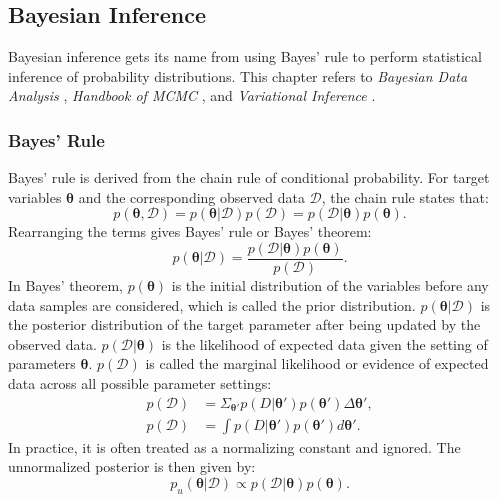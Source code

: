 \subsection{Bayesian Inference}
Bayesian inference gets its name from using Bayes' rule to perform statistical inference of probability distributions.
This chapter refers to \textit{Bayesian Data Analysis} \citep{gelman2013bayesian}, \textit{Handbook of MCMC} \citep{Allen_2007}, and \textit{Variational Inference} \citep{Blei_2017}.

\subsubsection{Bayes' Rule}
Bayes' rule is derived from the chain rule of conditional probability. For target variables $\boldsymbol{\theta}$ and the corresponding observed data $\mathcal{D}$, the chain rule states that:
\begin{equation}
    p(\boldsymbol{\theta}, \mathcal{D}) = p(\boldsymbol{\theta}|\mathcal{D})p(\mathcal{D}) = p(\mathcal{D}|\boldsymbol{\theta})p(\boldsymbol{\theta}).
\end{equation}
Rearranging the terms gives Bayes' rule or Bayes' theorem:
\begin{equation}
\label{eq:bayes}
    p(\boldsymbol{\theta}|\mathcal{D})= \frac{p(\mathcal{D}|\boldsymbol{\theta})p(\boldsymbol{\theta})}{p(\mathcal{D})}.
\end{equation}
In Bayes' theorem, $p(\boldsymbol{\theta})$ is the initial distribution of the variables before any data samples are considered, which is called the prior distribution. $p(\boldsymbol{\theta}|\mathcal{D})$ is the posterior distribution of the target parameter after being updated by the observed data. $p(\mathcal{D}|\boldsymbol{\theta})$ is the likelihood of expected data given the setting of parameters $\boldsymbol{\theta}$. $p(\mathcal{D})$ is called the marginal likelihood or evidence of expected data across all possible parameter settings:
\begin{subequations}
    \begin{align}
    p(\mathcal{D}) &= \Sigma_{\boldsymbol{\theta}'}p(D|\boldsymbol{\theta}')p(\boldsymbol{\theta}')\Delta \boldsymbol{\theta}',\\
    p(\mathcal{D}) &= \int p(D|\boldsymbol{\theta}')p(\boldsymbol{\theta}')d\boldsymbol{\theta}'.
    \end{align}
\end{subequations}
In practice, it is often treated as a normalizing constant and ignored. The unnormalized posterior is then given by:
\begin{equation}
    p_u(\boldsymbol{\theta}|\mathcal{D}) \propto p(\mathcal{D}|\boldsymbol{\theta})p(\boldsymbol{\theta}).            
\end{equation}

